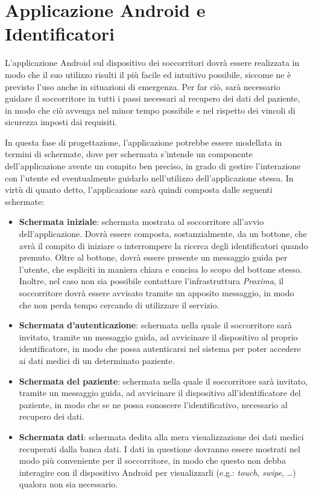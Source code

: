 \documentclass[a4paper,12pt]{report}
\begin{document}
\section{Applicazione Android e Identificatori} \label{design_app}

L'applicazione Android sul dispositivo dei soccorritori dovrà essere realizzata in modo che il suo utilizzo risulti il più facile ed intuitivo possibile, siccome ne è previsto l'uso anche in situazioni di emergenza. Per far ciò, sarà necessario guidare il soccorritore in tutti i passi necessari al recupero dei dati del paziente, in modo che ciò avvenga nel minor tempo possibile e nel rispetto dei vincoli di sicurezza imposti dai requisiti.

In questa fase di progettazione, l'applicazione potrebbe essere modellata in termini di schermate, dove per schermata s'intende un componente dell'applicazione avente un compito ben preciso, in grado di gestire l'interazione con l'utente ed eventualmente guidarlo nell'utilizzo dell'applicazione stessa. In virtù di quanto detto, l'applicazione sarà quindi composta dalle seguenti schermate:
\begin{itemize}
	\item \textbf{Schermata iniziale}: schermata mostrata al soccorritore all'avvio dell'applicazione. Dovrà essere composta, sostanzialmente, da un bottone, che avrà il compito di iniziare o interrompere la ricerca degli identificatori quando premuto. Oltre al bottone, dovrà essere presente un messaggio guida per l'utente, che espliciti in maniera chiara e concisa lo scopo del bottone stesso. Inoltre, nel caso non sia possibile contattare l'infrastruttura \emph{Proxima}, il soccorritore dovrà essere avvisato tramite un apposito messaggio, in modo che non perda tempo cercando di utilizzare il servizio.
	\item \textbf{Schermata d'autenticazione}: schermata nella quale il soccorritore sarà invitato, tramite un messaggio guida, ad avvicinare il dispositivo al proprio identificatore, in modo che possa autenticarsi nel sistema per poter accedere ai dati medici di un determinato paziente.
	\item \textbf{Schermata del paziente}: schermata nella quale il soccorritore sarà invitato, tramite un messaggio guida, ad avvicinare il dispositivo all'identificatore del paziente, in modo che se ne possa conoscere l'identificativo, necessario al recupero dei dati.
	\item \textbf{Schermata dati}: schermata dedita alla mera visualizzazione dei dati medici recuperati dalla banca dati. I dati in questione dovranno essere mostrati nel modo più conveniente per il soccorritore, in modo che questo non debba interagire con il dispositivo Android per visualizzarli (e.g.: \emph{touch}, \emph{swipe}, \dots) qualora non sia necessario.   
\end{itemize}
\end{document}
